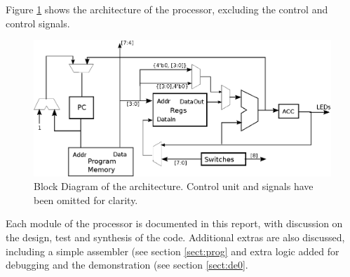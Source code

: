 Figure \ref{fig:arch} shows the architecture of the processor, excluding the control and control signals.

\begin{figure}
\includegraphics[width=\textwidth]{Figures/architecture.eps}
\caption{Block Diagram of the architecture. Control unit and signals have been omitted for clarity.}
\label{fig:arch}
\end{figure}

Each module of the processor is documented in this report, with discussion on the design, test and synthesis of the code. 
Additional extras are also discussed, including a simple assembler (see section \ref{sect:prog} and extra logic added for debugging and the demonstration (see section \ref{sect:de0}.

